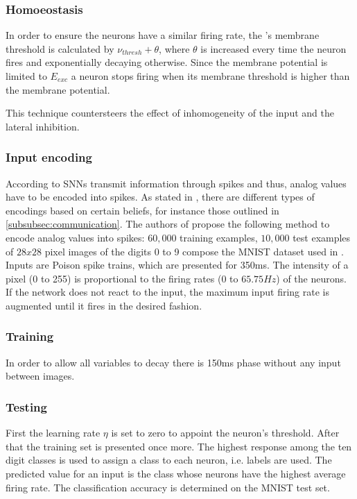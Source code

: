 \subsubsection{Homoeostasis}
In order to ensure the neurons have a similar firing rate, the \eN{}'s membrane threshold is calculated by $\nu_{thresh} + \theta$, where $\theta$ is increased every time the neuron fires and exponentially decaying otherwise.
Since the membrane potential is limited to $E_{exc}$ a neuron stops firing when its membrane threshold is higher than the membrane potential.

This technique countersteers the effect of inhomogeneity of the input and the lateral inhibition.


\subsubsection{Input encoding}
According to \cite{DIET_SNN} \acp{SNN} transmit information through spikes and thus, analog values have to be encoded into spikes.
As stated in \cite{DIET_SNN}, there are different types of encodings based on certain beliefs, 
for instance those outlined in \autoref{subsubsec:communication}.
The authors of \cite{SNN} propose the following method to encode analog values into spikes:
$60,000$ training examples, $10,000$ test examples of $28x28$ pixel images of the digits 0 to 9 compose the MNIST dataset used in \cite{SNN}.
Inputs are Poison spike trains, which are presented for 350ms.
The intensity of a pixel (0 to 255) is proportional to the firing rates (0 to $65.75 Hz$) of the neurons.
If the network does not react to the input, the maximum input firing rate is augmented until it fires in the desired fashion. 


\subsubsection{Training}
In order to allow all variables to decay there is 150ms phase without any input between images.

\subsubsection{Testing}
First the learning rate $\eta$ is set to zero to appoint the neuron's threshold.
After that the training set is presented once more.
The highest response among the ten digit classes is used to assign a class to each neuron, i.e. labels are used.
The predicted value for an input is the class whose neurons have the highest average firing rate.
The classification accuracy is determined on the MNIST test set.